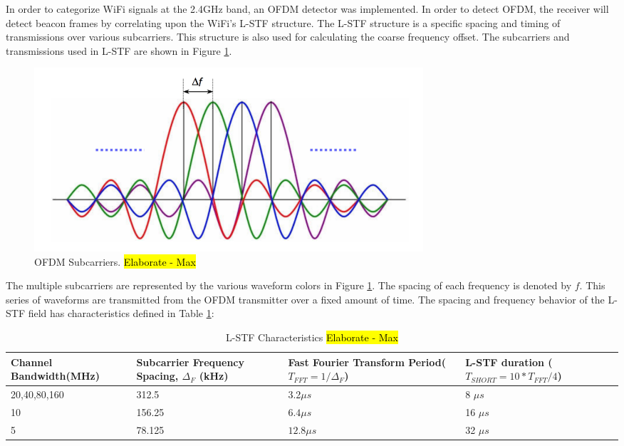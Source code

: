 In order to categorize WiFi signals at the 2.4GHz band, an OFDM detector was implemented. In order to detect OFDM, the receiver will detect beacon frames by correlating upon the WiFi’s L-STF structure. The L-STF structure is a specific spacing and timing of transmissions over various subcarriers. This structure is also used for calculating the coarse frequency offset. The subcarriers and transmissions used in L-STF are shown in Figure \ref{fig:ofdm_subcarriers}. \par 
\begin{figure}[ht!]
	\centering
	\includegraphics[width=0.70\textwidth]{img/ofdm-subcarriers}
	\caption{OFDM Subcarriers. \hl{Elaborate - Max}}
	\label{fig:ofdm_subcarriers}
\end{figure}\par
The multiple subcarriers are represented by the various waveform colors in Figure \ref{fig:ofdm_subcarriers}. The spacing of each frequency is denoted by $f$. This series of waveforms are transmitted from the OFDM transmitter over a fixed amount of time. The spacing and frequency behavior of the L-STF field has characteristics defined in Table \ref{table:spacing}: \par
\begin{table}[ht!]
	\centering
	\caption{L-STF Characteristics \hl{Elaborate - Max}}	
\begin{tabular}{|p{3.6cm}|p{4cm}|p{4cm}|p{4.5cm}|}
	\hline
	Channel Bandwidth\newline(MHz) & Subcarrier Frequency Spacing, $\Delta_F$ (kHz) &Fast Fourier Transform Period\newline($T_{FFT}=1/\Delta_F$)& L-STF duration \newline($T_{SHORT}=10*T_{FFT}/4$) \\
	\hline
	20,40,80,160 & 312.5 &3.2$\mu s$ &8 $\mu s$ \\
	10 & 156.25 &$6.4\mu s$ &16 $\mu s $\\
	5 & 78.125 &$12.8\mu s$ &32 $\mu s$  \\
	\hline
\end{tabular} 

	\label{table:spacing}
\end{table} \par 
	

